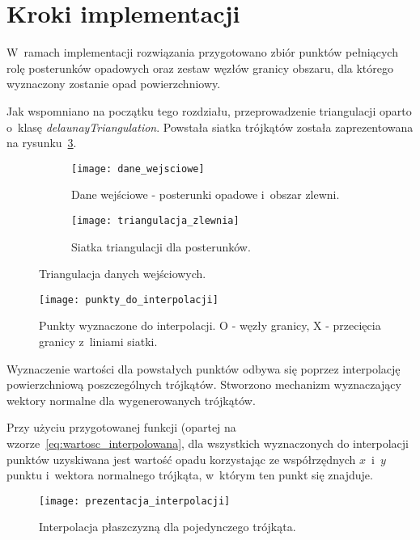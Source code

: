 \section{Kroki implementacji}
W~ramach implementacji rozwiązania przygotowano zbiór punktów pełniących rolę posterunków opadowych oraz zestaw węzłów granicy obszaru, dla którego wyznaczony zostanie opad powierzchniowy.

Jak wspomniano na początku tego rozdziału, przeprowadzenie triangulacji oparto o~klasę \textit{delaunayTriangulation}. Powstała siatka trójkątów została zaprezentowana na rysunku~\ref{fig:triagnulacja_danych}.

\begin{figure}[!ht]
	\centering
\begin{subfigure}{1\textwidth}
	\centering
	\texttt{[image: dane\_wejsciowe]}
	\caption{Dane wejściowe - posterunki opadowe i~obszar zlewni.}
	\label{fig:dane_wejsciowe}
\end{subfigure}	
	\begin{subfigure}{1\textwidth}
	\centering
	\texttt{[image: triangulacja\_zlewnia]}
	\caption{Siatka triangulacji dla posterunków.}
	\label{fig:triagnulacja_danych}
\end{subfigure}	
\caption{Triangulacja danych wejściowych.}
	
\end{figure}


\begin{figure}[!ht]
	\centering
	\texttt{[image: punkty\_do\_interpolacji]}
	\caption{Punkty wyznaczone do interpolacji.
	O - węzły granicy, X - przecięcia granicy z~liniami siatki.}
	\label{fig:punkty_interpolacji}
\end{figure}

Wyznaczenie wartości dla powstałych punktów odbywa się poprzez interpolację powierzchniową poszczególnych trójkątów. Stworzono mechanizm wyznaczający wektory normalne dla wygenerowanych trójkątów. 

Przy użyciu przygotowanej funkcji (opartej na wzorze~\ref{eq:wartosc_interpolowana}, dla wszystkich wyznaczonych do interpolacji punktów uzyskiwana jest wartość opadu korzystając ze współrzędnych $x$~i~$y$ punktu i~wektora normalnego trójkąta, w~którym ten punkt się znajduje.

\begin{figure}[!ht]
	\centering
	\texttt{[image: prezentacja\_interpolacji]}
	\caption{Interpolacja płaszczyzną dla pojedynczego trójkąta.}
	\label{fig:plaszczyzna_interpolacji}
\end{figure}


